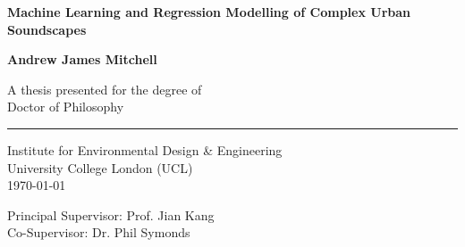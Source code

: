 \documentclass[twoside,fontsize=12pt,titlepage]{scrbook}
\begin{document}
\begin{titlepage}
      \AddToShipoutPicture*{}
      \begin{center}
            \vspace*{3cm}

            \Huge
            \textbf{Machine Learning and Regression Modelling of Complex Urban Soundscapes}

            \LARGE

            \vspace{1.5cm}

            \textbf{Andrew James Mitchell}

            \vfill
            A thesis presented for the degree of\\
            Doctor of Philosophy\\
            \rule[-.5cm]{0.5\textwidth}{1pt}

            \vspace{1.5cm}

            \Large
            Institute for Environmental Design \& Engineering\\
            University College London (UCL)\\
            \today

            \vspace{1cm}

            Principal Supervisor: Prof. Jian Kang\\
            Co-Supervisor: Dr. Phil Symonds

      \end{center}
\end{titlepage}


\restoregeometry


\end{document}
